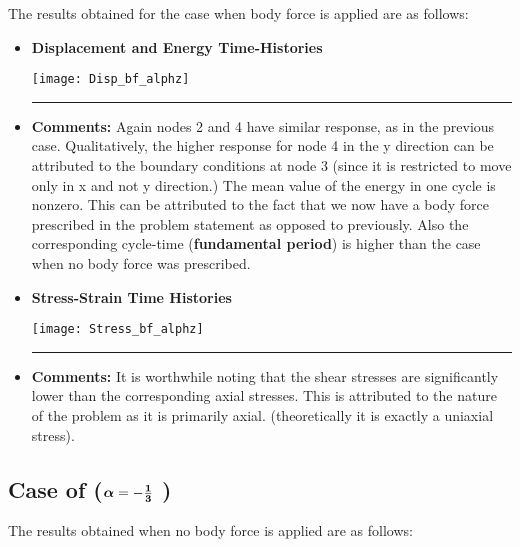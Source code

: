 \newpage The results obtained for the case when body force is applied are as follows: 
\begin{itemize}
\item {\bf Displacement and Energy Time-Histories}
\begin{center}
\texttt{[image: Disp\_bf\_alphz]}
\end{center}\hrule
\item {\bf Comments:} Again nodes 2 and 4 have similar response, as in the previous case. Qualitatively, the higher response for node 4 in the y direction can be attributed to the boundary conditions at node 3 (since it is restricted to move only in x and not y direction.) The mean value of the energy in one cycle is nonzero. This can be attributed to the fact that we now have a body force prescribed in the problem statement as opposed to previously. Also the corresponding cycle-time ({\bf fundamental period}) is higher than the case when no body force was prescribed. 
\newpage 
\item {\bf Stress-Strain Time Histories}
\begin{center}
\texttt{[image: Stress\_bf\_alphz]}
\end{center}\hrule
\item {\bf Comments: } It is worthwhile noting that the shear stresses are significantly lower than the  corresponding axial stresses. This is attributed to the nature of the problem as it is primarily axial. (theoretically it is exactly a uniaxial stress).
\end{itemize}
\newpage \subsection*{Case of ($\bm\alpha\bf = -\frac{1}{3}$ )}
The results obtained when no body force is applied are as follows: 
